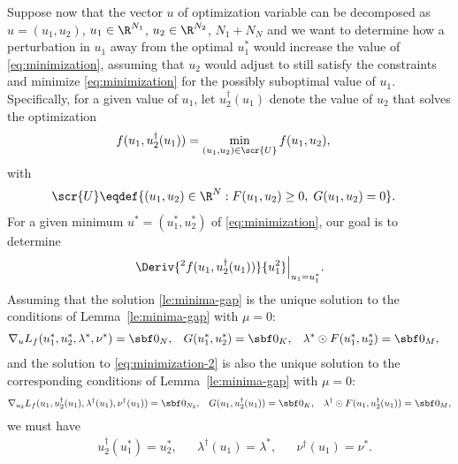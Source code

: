 \documentclass[11pt]{article}
\begin{document}
Suppose now that the vector $u$ of optimization variable can be
decomposed as $u=(u_1,u_2)$, $u_1\in\R^{N_1}$, $u_2\in\R^{N_2}$,
$N_1+N_N$ and we want to determine how a perturbation in $u_1$ away
from the optimal $u_1^*$ would increase the value of
\eqref{eq:minimization}, assuming that $u_2$ would adjust to still
satisfy the constraints and minimize \eqref{eq:minimization} for the
possibly suboptimal value of $u_1$.
%
Specifically, for a given value of $u_1$, let $u_2^\dagger(u_1)$ denote
the value of $u_2$ that solves the optimization
\begin{align}\label{eq:minimization-2}
  f(u_1,u_2^\dagger(u_1))&=\min_{(u_1,u_2)\in\scr{U}} f(u_1,u_2), &
\end{align}
with
\begin{align*}
  \scr{U}&\eqdef\{(u_1,u_2)\in\R^{N}: F(u_1,u_2)\ge 0,\; G(u_1,u_2)=0\}.
\end{align*}
For a given minimum $u^*=(u_1^*,u_2^*)$ of \eqref{eq:minimization}, our
goal is to determine
\begin{align*}
  \Deriv{^2f(u_1,u_2^\dagger(u_1))}{u_1^2}\Big|_{u_1=u_1^*}.
\end{align*}
Assuming that the solution \eqref{le:minima-gap} is the unique
solution to the conditions of Lemma~\ref{le:minima-gap} with $\mu=0$:
\begin{align}\label{eq:u-star}
  &\nabla_u L_f(u_1^*,u_2^*,\lambda^*,\nu^*)=\sbf 0_{N}, &
  &G(u_1^*,u_2^*)=\sbf 0 _{K}, &
  &\lambda^*\odot F(u_1^*,u_2^*)=\sbf 0_{M}, &
\end{align}
and the solution to \eqref{eq:minimization-2} is also the unique
solution to the corresponding conditions of Lemma~\ref{le:minima-gap}
with $\mu=0$:
  \begin{align}\label{eq:u-dagger}
  &\nabla_{u_2} L_f(u_1,u_2^\dagger(u_1),\lambda^\dagger(u_1),\nu^\dagger(u_1))=\sbf 0_{N_2}, &
  &G(u_1,u_2^\dagger(u_1))=\sbf 0 _{K}, 
  &\lambda^\dagger\odot F(u_1,u_2^\dagger(u_1))=\sbf 0_{M}, 
\end{align}
we must have
\begin{align*}
  &u_2^\dagger(u_1^*)=u_2^*, &
  &\lambda^\dagger(u_1)=\lambda^*, &
  &\nu^\dagger(u_1)=\nu^*.
\end{align*}
\end{document}
